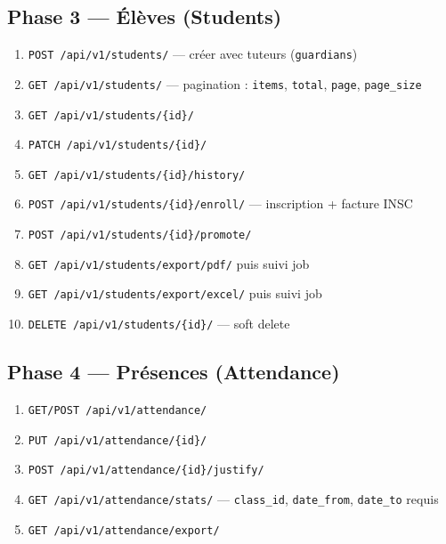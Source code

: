 \documentclass[11pt,a4paper]{article}
\begin{document}
\subsection{Phase 3 --- Élèves (Students)}
\begin{enumerate}[noitemsep]
    \item \texttt{POST /api/v1/students/} --- créer avec tuteurs (\texttt{guardians})
    \item \texttt{GET /api/v1/students/} --- pagination : \texttt{items}, \texttt{total}, \texttt{page}, \texttt{page\_size}
    \item \texttt{GET /api/v1/students/\{id\}/}
    \item \texttt{PATCH /api/v1/students/\{id\}/}
    \item \texttt{GET /api/v1/students/\{id\}/history/}
    \item \texttt{POST /api/v1/students/\{id\}/enroll/} --- inscription + facture INSC
    \item \texttt{POST /api/v1/students/\{id\}/promote/}
    \item \texttt{GET /api/v1/students/export/pdf/} puis suivi job
    \item \texttt{GET /api/v1/students/export/excel/} puis suivi job
    \item \texttt{DELETE /api/v1/students/\{id\}/} --- soft delete
\end{enumerate}

\subsection{Phase 4 --- Présences (Attendance)}
\begin{enumerate}[noitemsep]
    \item \texttt{GET/POST /api/v1/attendance/}
    \item \texttt{PUT /api/v1/attendance/\{id\}/}
    \item \texttt{POST /api/v1/attendance/\{id\}/justify/}
    \item \texttt{GET /api/v1/attendance/stats/} --- \texttt{class\_id}, \texttt{date\_from}, \texttt{date\_to} requis
    \item \texttt{GET /api/v1/attendance/export/}
\end{enumerate}
\end{document}
